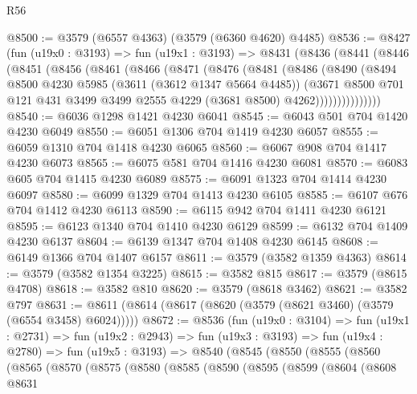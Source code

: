\begin{lexlean}{R56}
\begin{coremodule}
@8500 := @3579 (@6557 @4363) (@3579 (@6360 @4620) @4485)
@8536 := @8427
    (fun (u19x0 : @3193) =>
    fun (u19x1 : @3193) =>
    @8431
      (@8436
        (@8441
          (@8446
            (@8451
              (@8456
                (@8461
                  (@8466
                    (@8471
                      (@8476
                        (@8481
                          (@8486
                            (@8490
                              (@8494
                                @8500
                                @4230
                                @5985
                                (@3611 (@3612 @1347 @5664 @4485))
                                (@3671
                                  @8500
                                  @701
                                  @121
                                  @431
                                  @3499
                                  @3499
                                  @2555
                                  @4229
                                  (@3681 @8500)
                                  @4262)))))))))))))))
@8540 := @6036 @1298 @1421 @4230 @6041
@8545 := @6043 @501 @704 @1420 @4230 @6049
@8550 := @6051 @1306 @704 @1419 @4230 @6057
@8555 := @6059 @1310 @704 @1418 @4230 @6065
@8560 := @6067 @908 @704 @1417 @4230 @6073
@8565 := @6075 @581 @704 @1416 @4230 @6081
@8570 := @6083 @605 @704 @1415 @4230 @6089
@8575 := @6091 @1323 @704 @1414 @4230 @6097
@8580 := @6099 @1329 @704 @1413 @4230 @6105
@8585 := @6107 @676 @704 @1412 @4230 @6113
@8590 := @6115 @942 @704 @1411 @4230 @6121
@8595 := @6123 @1340 @704 @1410 @4230 @6129
@8599 := @6132 @704 @1409 @4230 @6137
@8604 := @6139 @1347 @704 @1408 @4230 @6145
@8608 := @6149 @1366 @704 @1407 @6157
@8611 := @3579 (@3582 @1359 @4363)
@8614 := @3579 (@3582 @1354 @3225)
@8615 := @3582 @815
@8617 := @3579 (@8615 @4708)
@8618 := @3582 @810
@8620 := @3579 (@8618 @3462)
@8621 := @3582 @797
@8631 := @8611 (@8614 (@8617 (@8620 (@3579 (@8621 @3460) (@3579 (@6554 @3458) @6024)))))
@8672 := @8536
    (fun (u19x0 : @3104) =>
    fun (u19x1 : @2731) =>
    fun (u19x2 : @2943) =>
    fun (u19x3 : @3193) =>
    fun (u19x4 : @2780) =>
    fun (u19x5 : @3193) =>
    @8540
      (@8545
        (@8550
          (@8555
            (@8560
              (@8565
                (@8570
                  (@8575
                    (@8580
                      (@8585
                        (@8590
                          (@8595
                            (@8599
                              (@8604
                                (@8608
                                  @8631

\end{coremodule}
\end{lexlean}
